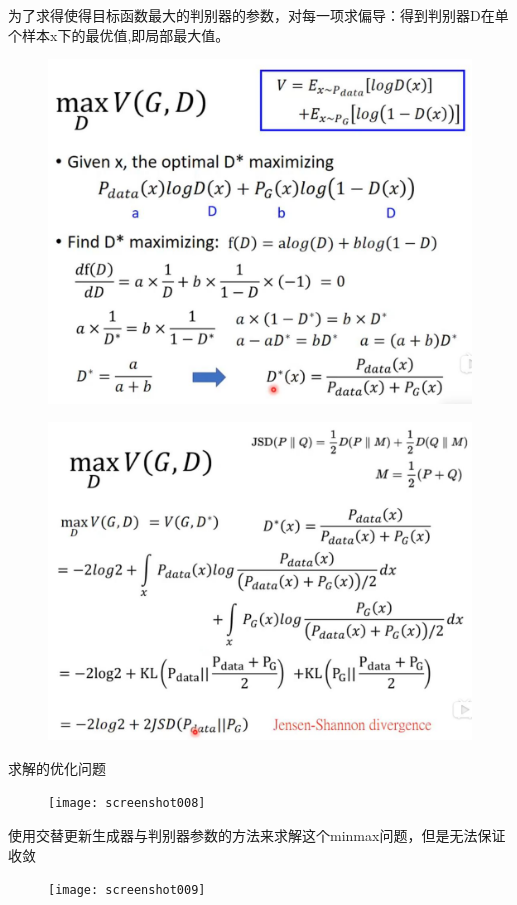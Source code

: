 \documentclass[UTF8]{ctexart} %
\begin{document}
	为了求得使得目标函数最大的判别器的参数，对每一项求偏导：得到判别器D在单个样本x下的最优值,即局部最大值。
	\begin{figure}[H]
	\centering
	\includegraphics[scale=0.4]{screenshot006}
	\caption{}
	\label{fig:screenshot006}
	\end{figure}
	
	
	\begin{figure}[H]
	\centering
	\includegraphics[scale=0.4]{screenshot007}
	\caption{}
	\label{fig:screenshot007}
	\end{figure}
	
	求解的优化问题
	\begin{figure}[H]
	\centering
	\texttt{[image: screenshot008]}
	\caption{}
	\label{fig:screenshot008}
	\end{figure}
	使用交替更新生成器与判别器参数的方法来求解这个minmax问题，但是无法保证收敛
	\begin{figure}[H]
	\centering
	\texttt{[image: screenshot009]}
	\caption{}
	\label{fig:screenshot009}
	\end{figure}
	
\end{document}

